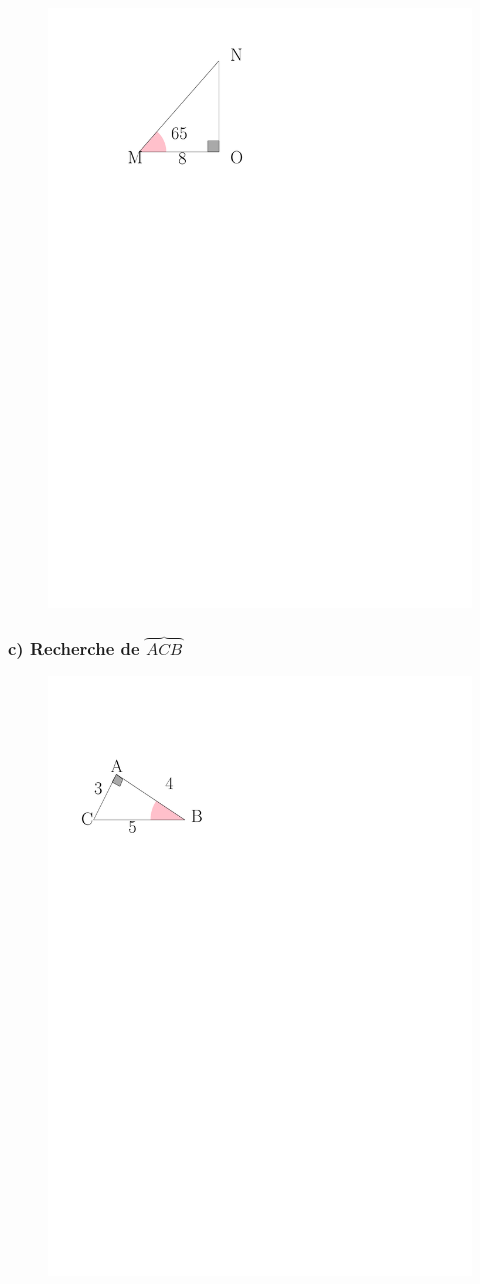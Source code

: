 \documentclass[paper=a4, fontsize=11pt]{scrartcl} %
\begin{document}
\begin{multicols}{3}
  \begin{figure}[H]
	  \centering
	  \includegraphics[width=0.6\linewidth]{sources/2/rec-a2.pdf}
	\end{figure}

  \subsubsection*{c) Recherche de $\overbrace{ACB}$}
  
  \begin{figure}[H]
	  \centering
	  \includegraphics[width=.8\linewidth]{sources/2/rec-a3.pdf}
	\end{figure}
  \end{multicols}
\end{document}
